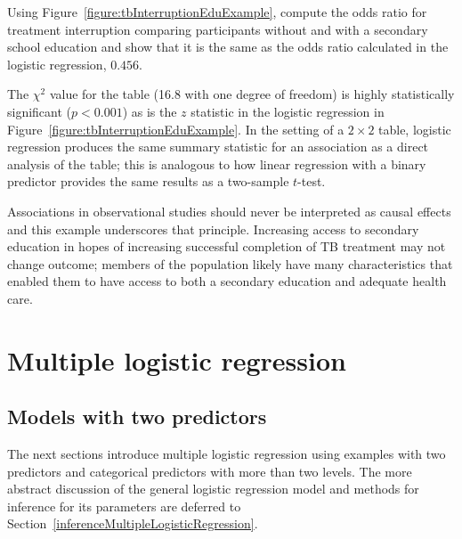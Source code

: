 \begin{exercisewrap}
  \begin{nexercise}
    Using Figure~\ref{figure:tbInterruptionEduExample}, compute the odds ratio for treatment interruption comparing participants without and with a secondary school education and show that it is the same as the odds ratio calculated in the logistic regression, $0.456$.
    \footnotemark{}
  \end{nexercise}
\end{exercisewrap}

The $\chi^2$ value for the table (16.8 with one degree of freedom) is highly statistically significant ($p < 0.001$) as is the $z$ statistic in the logistic regression in Figure~\ref{figure:tbInterruptionEduExample}. In the setting of a $2 \times 2$ table, logistic regression produces the same summary statistic for an association as a direct analysis of the table; this is analogous to how linear regression with a binary predictor provides the same results as a two-sample $t$-test.

Associations in observational studies should never be interpreted as causal effects and this example underscores that principle.  Increasing access to secondary education in hopes of increasing successful completion of TB treatment may not change outcome; members of the population likely have many characteristics that enabled them to have access to both a secondary education and adequate health care.

\section{Multiple logistic regression}
\label{generalMultipleLogistic}

\subsection{Models with two predictors}
\label{section:modelsWithTwoPredictors}

The next sections introduce multiple logistic regression using examples with two predictors and categorical predictors with more than two levels.  The more abstract discussion of the general logistic regression model and methods for inference for its parameters are deferred to Section~\ref{inferenceMultipleLogisticRegression}.

